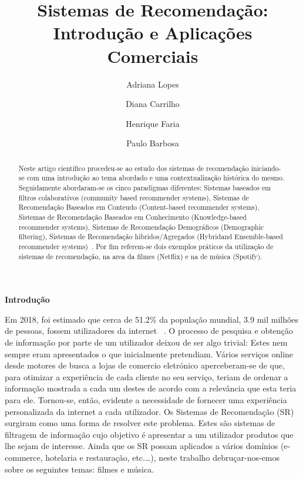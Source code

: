 %
\title{Sistemas de Recomendação: Introdução e Aplicações Comerciais}
%
%
\author{Adriana Lopes \and Diana Carrilho \and Henrique Faria \and Paulo Barbosa}
%
%
%
\maketitle              %
%
\begin{abstract}
Neste artigo cientifico procedeu-se ao estudo dos sistemas de recomendação iniciando-se com uma introdução ao tema abordado e uma contextualização histórica do mesmo. Seguidamente abordaram-se os cinco paradigmas diferentes: Sistemas baseados em filtros colaborativos (community based recommender systems), Sistemas de Recomendação Baseados em Conteudo (Content-based recommender systems), Sistemas de Recomendação Baseados em Conhecimento
(Knowledge-based recommender systems), Sistemas de Recomendação Demográficos (Demographic filtering), Sistemas de Recomendação hibridos/Agregados (Hybridand Ensemble-based recommender systems)~\cite{ref_book1}. Por fim referem-se dois exemplos práticos da utilização de sistemas de recomendação, na area da filmes (Netflix) e na de música (Spotify).\newline

\end{abstract}
%
%
\begin{center}
\normalsize{\bfseries Introdução}\hfill 
\end{center}
Em 2018, foi estimado que cerca de 51.2\% da população mundial, 3.9 mil milhões de pessoas, fossem utilizadores da internet~\cite{ref_url1} . O processo de pesquisa e obtenção de informação por parte de um utilizador deixou de ser algo trivial: Estes nem sempre eram apresentados o que inicialmente pretendiam. 
Vários serviços online desde motores de busca a lojas de comercio eletrónico aperceberam-se de que, para otimizar a experiência de cada cliente no seu serviço, teriam de ordenar a informação mostrada a cada um destes de acordo com a relevância que esta teria para ele. Tornou-se, então, evidente a necessidade de fornecer uma experiência personalizada da internet a cada utilizador.  
Os Sistemas de Recomendação (SR) surgiram como uma forma de resolver este problema. Estes são sistemas de filtragem de informação cujo objetivo é apresentar a um utilizador produtos que lhe sejam de interesse. 
Ainda que os SR possam aplicados a vários domínios (e-commerce, hotelaria e restauração, etc.…), neste trabalho debruçar-nos-emos sobre os seguintes temas: filmes e música. 





